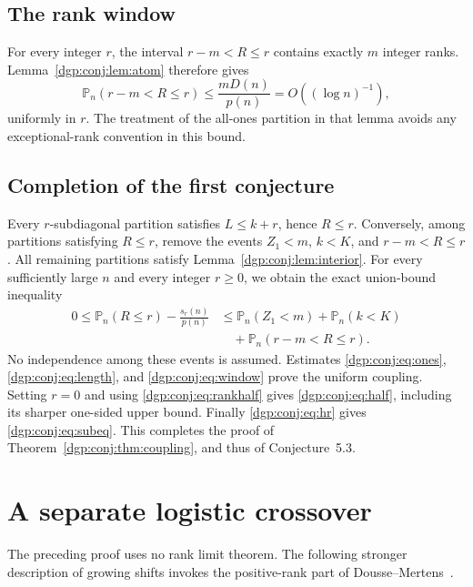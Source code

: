 \documentclass[11pt,letterpaper]{article}
\numberwithin{equation}{section}
\theoremstyle{remark}\newtheorem{remark}[theorem]{Remark}
\newcommand{\PP}{\mathbb P}
\begin{document}
\subsection{The rank window}
For every integer $r$, the interval $r-m<R\leq r$ contains exactly
$m$ integer ranks. Lemma~\ref{dgp:conj:lem:atom} therefore gives
\begin{equation}\label{dgp:conj:eq:window}
 \PP_n(r-m<R\leq r)\leq\frac{mD(n)}{p(n)}
 =O((\log n)^{-1}),
\end{equation}
uniformly in $r$. The treatment of the all-ones partition in that
lemma avoids any exceptional-rank convention in this bound.

\subsection{Completion of the first conjecture}
Every $r$-subdiagonal partition satisfies $L\leq k+r$, hence
$R\leq r$. Conversely, among partitions satisfying $R\leq r$,
remove the events $Z_1<m$, $k<K$, and $r-m<R\leq r$.
All remaining partitions satisfy Lemma~\ref{dgp:conj:lem:interior}.
For every sufficiently large $n$ and every integer $r\geq0$, we
obtain the exact union-bound inequality
\begin{align}
 0\leq\PP_n(R\leq r)-\frac{s_r(n)}{p(n)}
 &\leq \PP_n(Z_1<m)+\PP_n(k<K)\nonumber\\
 &\hspace{1em}+\PP_n(r-m<R\leq r).\label{dgp:conj:eq:union}
\end{align}
No independence among these events is assumed. Estimates
\eqref{dgp:conj:eq:ones}, \eqref{dgp:conj:eq:length}, and \eqref{dgp:conj:eq:window} prove the
uniform coupling. Setting $r=0$ and using \eqref{dgp:conj:eq:rankhalf} gives
\eqref{dgp:conj:eq:half}, including its sharper one-sided upper bound.
Finally \eqref{dgp:conj:eq:hr} gives \eqref{dgp:conj:eq:subeq}. This completes the
proof of Theorem~\ref{dgp:conj:thm:coupling}, and thus of Conjecture~5.3.

\section{A separate logistic crossover}\label{dgp:conj:sec:logistic}
The preceding proof uses no rank limit theorem. The following
stronger description of growing shifts invokes the positive-rank
part of Dousse--Mertens~\cite[Theorem~1.2]{dm}.
\end{document}
